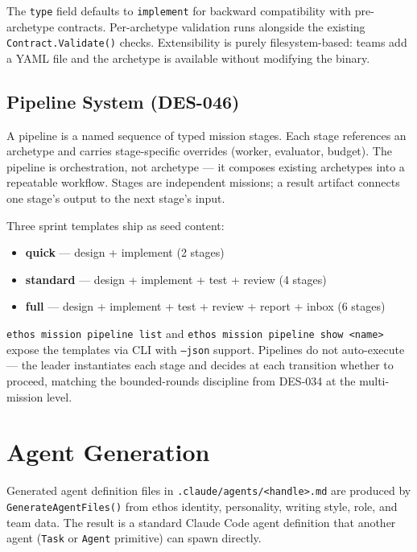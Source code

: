 \documentclass[a4paper,10pt]{article}
\newcommand{\field}[1]{\texttt{#1}}
\newcommand{\cmd}[1]{\texttt{#1}}
\newcommand{\fpath}[1]{\texttt{#1}}
\begin{document}
The \field{type} field defaults to \texttt{implement} for backward
compatibility with pre-archetype contracts.  Per-archetype validation
runs alongside the existing \texttt{Contract.Validate()} checks.
Extensibility is purely filesystem-based: teams add a YAML file and
the archetype is available without modifying the binary.

\subsection{Pipeline System (DES-046)}

A pipeline is a named sequence of typed mission stages.  Each stage
references an archetype and carries stage-specific overrides (worker,
evaluator, budget).  The pipeline is orchestration, not archetype ---
it composes existing archetypes into a repeatable workflow.  Stages are
independent missions; a result artifact connects one stage's output to
the next stage's input.

Three sprint templates ship as seed content:

\begin{itemize}
  \item \textbf{quick} --- design + implement (2 stages)
  \item \textbf{standard} --- design + implement + test + review
    (4 stages)
  \item \textbf{full} --- design + implement + test + review +
    report + inbox (6 stages)
\end{itemize}

\cmd{ethos mission pipeline list} and
\cmd{ethos mission pipeline show <name>} expose the templates via
CLI with \cmd{--json} support.  Pipelines do not auto-execute ---
the leader instantiates each stage and decides at each transition
whether to proceed, matching the bounded-rounds discipline from
DES-034 at the multi-mission level.

\section{Agent Generation}

Generated agent definition files in \fpath{.claude/agents/<handle>.md}
are produced by \texttt{GenerateAgentFiles()} from ethos identity,
personality, writing style, role, and team data.  The result is a
standard Claude Code agent definition that another agent
(\texttt{Task} or \texttt{Agent} primitive) can spawn directly.
\end{document}

